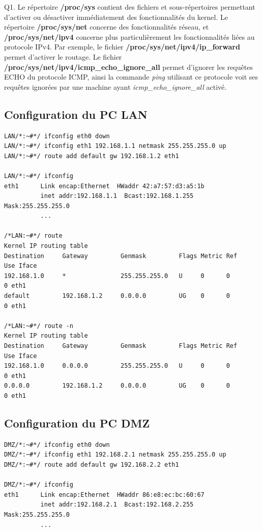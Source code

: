 \documentclass[frenchb, 11pt]{article}
\newlength{\leftbarwidth}
\newlength{\leftbarsep}
\newcommand*{\leftbarcolorcmd}{\color{leftbarcolor}} %
\renewenvironment{leftbar}{%
    \def\FrameCommand{{\leftbarcolorcmd{\vrule width \leftbarwidth\relax\hspace {\leftbarsep}}}}%
    \MakeFramed {\advance \hsize -\width \FrameRestore }%
}{%
    \endMakeFramed
}
\begin{document}
\begin{leftbar}
\noindent Q1. Le répertoire \textbf{/proc/sys} contient des fichiers et sous-répertoires permettant d'activer ou désactiver immédiatement des fonctionnalités du kernel. Le répertoire \textbf{/proc/sys/net} concerne des fonctionnalités réseau, et \textbf{/proc/sys/net/ipv4} concerne plus particulièrement les fonctionnalités liées au protocole IPv4. Par exemple, le fichier \textbf{/proc/sys/net/ipv4/ip\_forward} permet d'activer le routage. Le fichier \textbf{/proc/sys/net/ipv4/icmp\_echo\_ignore\_all} permet d'ignorer les requêtes ECHO du protocole ICMP, ainsi la commande \emph{ping} utilisant ce protocole voit ses requêtes ignorées par une machine ayant \emph{icmp\_echo\_ignore\_all} activé.
\end{leftbar}

\subsection{Configuration du PC LAN}
\begin{lstlisting}
LAN/*:~#*/ ifconfig eth0 down
LAN/*:~#*/ ifconfig eth1 192.168.1.1 netmask 255.255.255.0 up
LAN/*:~#*/ route add default gw 192.168.1.2 eth1

LAN/*:~#*/ ifconfig
eth1      Link encap:Ethernet  HWaddr 42:a7:57:d3:a5:1b
          inet addr:192.168.1.1  Bcast:192.168.1.255  Mask:255.255.255.0
          ...

/*LAN:~#*/ route
Kernel IP routing table
Destination     Gateway         Genmask         Flags Metric Ref    Use Iface
192.168.1.0     *               255.255.255.0   U     0      0        0 eth1
default         192.168.1.2     0.0.0.0         UG    0      0        0 eth1

/*LAN:~#*/ route -n
Kernel IP routing table
Destination     Gateway         Genmask         Flags Metric Ref    Use Iface
192.168.1.0     0.0.0.0         255.255.255.0   U     0      0        0 eth1
0.0.0.0         192.168.1.2     0.0.0.0         UG    0      0        0 eth1
\end{lstlisting}

\subsection{Configuration du PC DMZ}
\begin{lstlisting}
DMZ/*:~#*/ ifconfig eth0 down
DMZ/*:~#*/ ifconfig eth1 192.168.2.1 netmask 255.255.255.0 up
DMZ/*:~#*/ route add default gw 192.168.2.2 eth1

DMZ/*:~#*/ ifconfig
eth1      Link encap:Ethernet  HWaddr 86:e8:ec:bc:60:67
          inet addr:192.168.2.1  Bcast:192.168.2.255  Mask:255.255.255.0
          ...
\end{lstlisting}
\newpage
\end{document}
